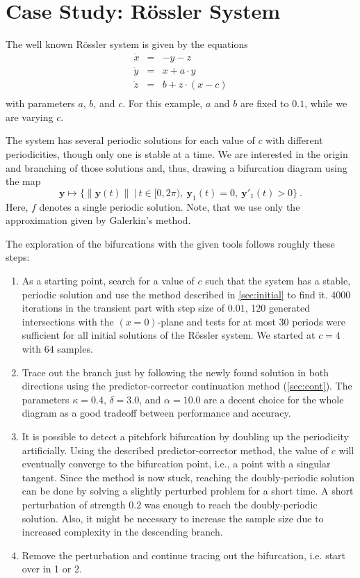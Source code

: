 \section{Case Study: Rössler System}

The well known Rössler system is given by the equations
\[
	\begin{array}{rcl}
		\dot x &=& -y - z \\
		\dot y &=& x + a \cdot y \\
		\dot z &=& b + z \cdot (x - c) \\
	\end{array}
\]
with parameters $a$, $b$, and $c$. For this example, $a$ and $b$
are fixed to $0.1$, while we are varying $c$.

The system has several periodic solutions for each value of $c$ with different
periodicities, though only one is stable at a time. We are interested in the origin and
branching of those solutions and, thus, drawing a bifurcation diagram using the map
\[
	\mathbf y \mapsto \{ \|\mathbf y(t)\|  \ | \ t \in [0, 2\pi), \ \mathbf y_1(t) = 0, \ \mathbf y'_1(t) > 0 \} \ .
\]
Here, $f$ denotes a single periodic solution. Note, that we use only the approximation
given by Galerkin's method.

The exploration of the bifurcations with the given tools follows roughly these steps:
\begin{enumerate}
	\item As a starting point, search for a value of $c$ such that the system has a
		stable, periodic solution and use the method described in
		\autoref{sec:initial} to find it. 4000 iterations in the transient part with step
		size of $0.01$, 120 generated intersections with the $(x=0)$-plane and tests for
		at most $30$ periods were sufficient for all initial solutions of the Rössler
		system. We started at $c=4$ with $64$ samples.
	\item Trace out the branch just by following the newly found solution in both directions
		using the predictor-corrector continuation method (\autoref{sec:cont}). The
		parameters $\kappa=0.4$, $\delta=3.0$, and $\alpha=10.0$ are a decent choice for
		the whole diagram as a good tradeoff between performance and accuracy.
	\item It is possible to detect a pitchfork bifurcation by doubling up the periodicity
		artificially. Using the described predictor-corrector method, the value
		of $c$ will eventually converge to the bifurcation point, i.e., a point with a
		singular tangent. Since the method is now stuck, reaching the doubly-periodic
		solution can be done by solving a slightly perturbed problem for a short time.
		A short perturbation of strength $0.2$ was enough to reach the doubly-periodic
		solution. Also, it might be necessary to increase the sample size due to increased
		complexity in the descending branch.
	\item Remove the perturbation and continue tracing out the bifurcation, i.e. start
		over in 1 or 2.
\end{enumerate}

